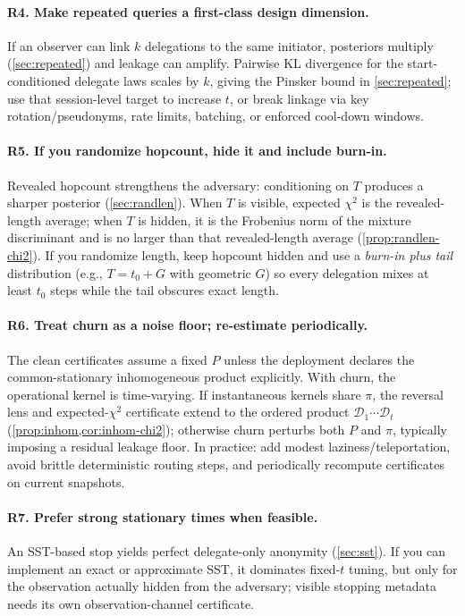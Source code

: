 \documentclass[11pt]{article}
\newcommand{\cD}{\mathcal{D}}
\begin{document}
\paragraph{R4. Make repeated queries a first-class design dimension.}
If an observer can link $k$ delegations to the same initiator, posteriors
multiply (\cref{sec:repeated}) and leakage can amplify.  Pairwise KL divergence
for the start-conditioned delegate laws scales by $k$, giving the Pinsker bound
in \cref{sec:repeated}; use that session-level target to increase $t$, or break
linkage via key rotation/pseudonyms, rate limits, batching, or enforced cool-down
windows.

\paragraph{R5. If you randomize hopcount, hide it and include burn-in.}
Revealed hopcount strengthens the adversary: conditioning on $T$ produces a
sharper posterior (\cref{sec:randlen}).  When $T$ is visible, expected $\chi^2$ is the revealed-length average; when $T$
is hidden, it is the Frobenius norm of the mixture discriminant and is no larger
than that revealed-length average (\cref{prop:randlen-chi2}).  If you randomize
length, keep hopcount hidden and use a \emph{burn-in plus tail}
distribution (e.g., $T=t_0+G$ with geometric $G$) so every delegation mixes at
least $t_0$ steps while the tail obscures exact length.

\paragraph{R6. Treat churn as a noise floor; re-estimate periodically.}
The clean certificates assume a fixed $P$ unless the deployment declares the
common-stationary inhomogeneous product explicitly. With churn, the operational
kernel is time-varying. If instantaneous kernels share $\pi$, the reversal lens
and expected-$\chi^2$ certificate extend to the ordered product
$\cD_1\cdots\cD_t$ (\cref{prop:inhom,cor:inhom-chi2}); otherwise churn perturbs
both $P$ and $\pi$, typically imposing a residual leakage floor. In practice: add
modest laziness/teleportation, avoid brittle deterministic routing steps, and
periodically recompute certificates on current snapshots.

\paragraph{R7. Prefer strong stationary times when feasible.}
An SST-based stop yields perfect delegate-only anonymity (\cref{sec:sst}). If you
can implement an exact or approximate SST, it dominates fixed-$t$ tuning, but only
for the observation actually hidden from the adversary; visible stopping metadata
needs its own observation-channel certificate.
\end{document}
